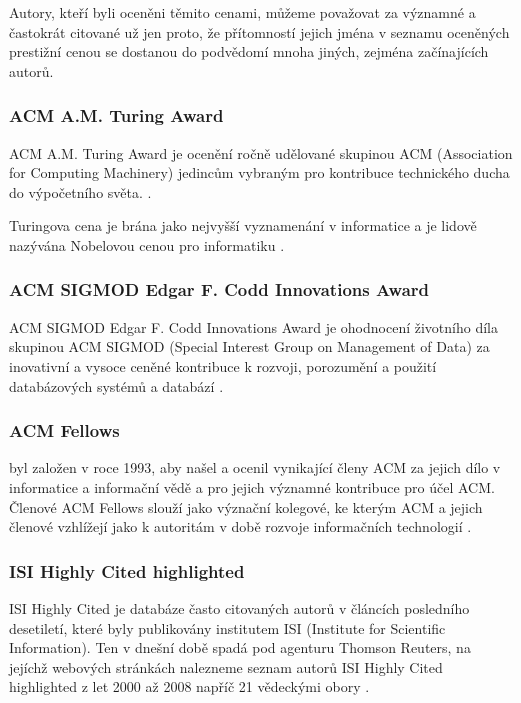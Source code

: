 \documentclass{bakalarka}
\begin{document}
Autory, kteří byli oceněni těmito cenami, můžeme považovat za významné a
častokrát citované už jen proto, že přítomností jejich jména v seznamu
oceněných prestižní cenou se dostanou do podvědomí mnoha jiných, zejména
začínajících autorů.

\subsubsection{ACM A.M. Turing Award}
ACM A.M. Turing Award je ocenění ročně udělované skupinou ACM (Association for
Computing Machinery) jedincům vybraným pro kontribuce technického ducha do
výpočetního světa.
\cite{turingaward}.

Turingova cena je brána jako nejvyšší vyznamenání v informatice a je lidově
nazývána Nobelovou cenou pro informatiku \cite[p.~317]{dasgupta}.

\subsubsection{ACM SIGMOD Edgar F. Codd Innovations Award}
ACM SIGMOD Edgar F. Codd Innovations Award je ohodnocení životního díla
skupinou ACM SIGMOD (Special Interest Group on Management of Data) za
inovativní a vysoce ceněné kontribuce k rozvoji, porozumění a použití
databázových systémů a databází \cite{sigmodinnovations}.

\subsubsection{ACM Fellows}
 byl založen v roce 1993, aby našel a ocenil
vynikající členy ACM za jejich dílo v informatice a informační vědě a pro
jejich významné kontribuce pro účel ACM. Členové ACM Fellows slouží jako
význační kolegové, ke kterým ACM a jejich členové vzhlížejí jako k autoritám v
době rozvoje informačních technologií \cite{acmfellows}.

\subsubsection{ISI Highly Cited highlighted}
ISI Highly Cited je databáze často citovaných autorů v článcích posledního
desetiletí, které byly publikovány institutem ISI (Institute for Scientific
Information). Ten v dnešní době spadá pod agenturu Thomson Reuters, na jejíchž
webových stránkách nalezneme seznam autorů ISI Highly Cited highlighted z let
2000 až 2008 napříč 21 vědeckými obory \cite{highlycited}.
\end{document}
